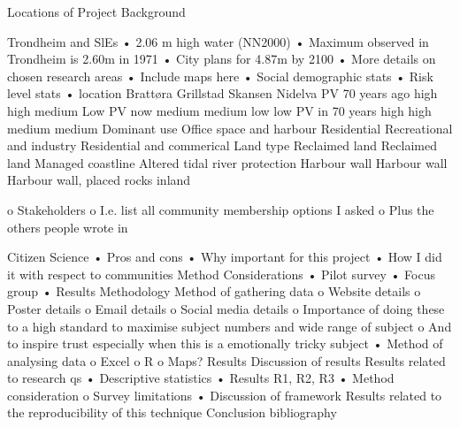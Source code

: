 Locations of Project Background

Trondheim and SlEs
•	2.06 m high water (NN2000)
•	Maximum observed in Trondheim is 2.60m in 1971
•	City plans for 4.87m by 2100
•	More details on chosen research areas
•	Include maps here 
•	Social demographic stats
•	Risk level stats
•	
location	Brattøra	Grillstad	Skansen 	Nidelva
PV 70 years ago	high	high	medium	Low
PV now	 medium	 medium	 low	 low
PV in 70 years	 high	 high	 medium	 medium
Dominant use	Office space and harbour	Residential	Recreational and industry	Residential and commerical
Land type	Reclaimed land	Reclaimed land	Managed coastline 	Altered tidal river
protection	Harbour wall	Harbour wall	Harbour wall, placed rocks	inland
 	 	 	 	 

o	Stakeholders
o	I.e. list all community membership options I asked
o	Plus the others people wrote in

Citizen Science
•	Pros and cons
•	Why important for this project
•	How I did it with respect to communities
Method Considerations
•	Pilot survey
•	Focus group
•	Results
Methodology
Method of gathering data
o	Website details
o	Poster details
o	Email details
o	Social media details
o	Importance of doing these to a high standard to maximise subject numbers and wide range of subject
o	And to inspire trust especially when this is a emotionally tricky subject
•	Method of analysing data
o	Excel
o	R
o	Maps?
Results
Discussion of results
Results related to research qs
•	Descriptive statistics
•	Results R1, R2, R3 
•	Method consideration
o	Survey limitations
•	
Discussion of framework 
Results related to the reproducibility of this technique
Conclusion 
bibliography

